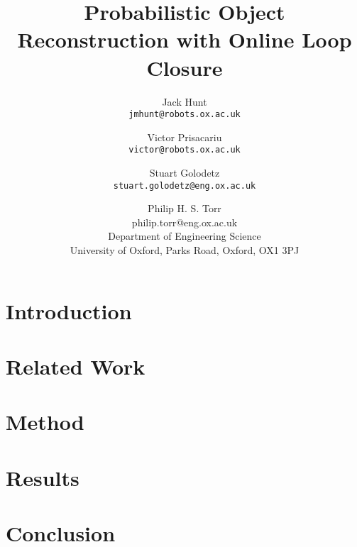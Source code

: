 \documentclass[10pt,twocolumn,letterpaper]{article}
\begin{document}
\title{Probabilistic Object Reconstruction with Online Loop Closure}

\author{Jack Hunt\\
{\tt\small jmhunt@robots.ox.ac.uk}\\
\and
Victor Prisacariu\\
{\tt\small victor@robots.ox.ac.uk}\\
\and
Stuart Golodetz\\
{\tt\small stuart.golodetz@eng.ox.ac.uk}\\
\and
Philip H. S. Torr\\
{\ttfamily\small philip.torr@eng.ox.ac.uk}\\
Department of Engineering Science\\
University of Oxford,
Parks Road, Oxford, OX1 3PJ
}

\maketitle

\begin{abstract}

\end{abstract}

\section{Introduction}
\label{sec:introduction}



\section{Related Work}
\label{sec:lit_review}



\section{Method}



\section{Results}
\label{sec:results}



\section{Conclusion}
\label{sec:discussion}




{\small


}
\end{document}
